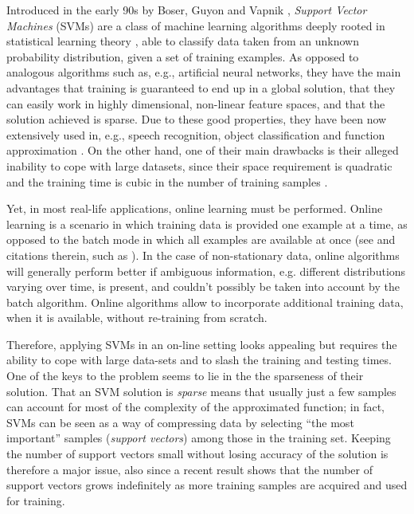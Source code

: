 Introduced in the early 90s by Boser, Guyon and Vapnik \cite{BGV92},
\emph{Support Vector Machines} (SVMs) are a class of machine learning
algorithms deeply rooted in statistical learning theory
\cite{v-edbed-82}, able to classify data taken from an unknown
probability distribution, given a set of training examples. As opposed
to analogous algorithms such as, e.g., artificial neural networks,
they have the main advantages that training is guaranteed to end up in
a global solution, that they can easily work in highly dimensional,
non-linear feature spaces, and that the solution achieved is
sparse. Due to these good properties, they have been now extensively
used in, e.g., speech recognition, object classification and function
approximation \cite{Cristianini00}. On the other hand, one of their
main drawbacks is their alleged inability to cope with large datasets,
since their space requirement is quadratic and the training time is
cubic in the number of training samples \cite{KeerthiCDC06}.

Yet, in most real-life applications, online learning must be
performed. Online learning is a scenario in which training data is
provided one example at a time, as opposed to the batch mode in which
all examples are available at once (see
\cite{Laskov2006} and citations therein, such as
\cite{Munro1951,lecun98efficient,Murata2002}). In the case of
non-stationary data, online algorithms will generally perform better
if ambiguous information, e.g. different distributions varying over
time, is present, and couldn't possibly be taken into account by the
batch algorithm. Online algorithms allow to incorporate additional
training data, when it is available, without re-training from
scratch.

Therefore, applying SVMs in an on-line setting looks appealing but
requires the ability to cope with large data-sets and to slash the
training and testing times. One of the keys to the problem seems to
lie in the the sparseness of their solution. That an SVM solution is
\emph{sparse} means that usually just a few samples can account for
most of the complexity of the approximated function; in fact, SVMs can
be seen as a way of compressing data by selecting ``the most
important'' samples (\emph{support vectors}) among those in the
training set. Keeping the number of support vectors small without
losing accuracy of the solution is therefore a major issue, also since
a recent result \cite{Steinwart03} shows that the number of support
vectors grows indefinitely as more training samples are acquired and
used for training.

